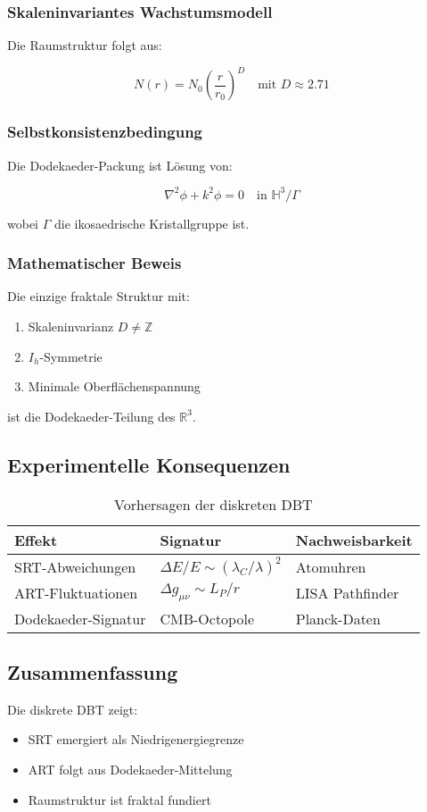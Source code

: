 \subsubsection{Skaleninvariantes Wachstumsmodell}
Die Raumstruktur folgt aus:

\begin{equation}
N(r) = N_0\left(\frac{r}{r_0}\right)^D \quad \text{mit } D \approx 2.71
\end{equation}

\subsubsection{Selbstkonsistenzbedingung}
Die Dodekaeder-Packung ist Lösung von:

\begin{equation}
\nabla^2\phi + k^2\phi = 0 \quad \text{in } \mathbb{H}^3/\Gamma
\end{equation}

wobei $\Gamma$ die ikosaedrische Kristallgruppe ist.

\subsubsection{Mathematischer Beweis}
\begin{theorem}
Die einzige fraktale Struktur mit:
\begin{enumerate}
\item Skaleninvarianz $D \neq \mathbb{Z}$
\item $I_h$-Symmetrie
\item Minimale Oberflächenspannung
\end{enumerate}
ist die Dodekaeder-Teilung des $\mathbb{R}^3$.
\end{theorem}

\subsection{Experimentelle Konsequenzen}
\label{subsec:experiments}

\begin{table}[h]
\centering
\caption{Vorhersagen der diskreten DBT}
\begin{tabular}{lll}
\hline
Effekt & Signatur & Nachweisbarkeit \\
\hline
SRT-Abweichungen & $\Delta E/E \sim (\lambda_C/\lambda)^2$ & Atomuhren \\
ART-Fluktuationen & $\Delta g_{\mu\nu} \sim L_P/r$ & LISA Pathfinder \\
Dodekaeder-Signatur & CMB-Octopole & Planck-Daten \\
\hline
\end{tabular}
\end{table}

\subsection{Zusammenfassung}
Die diskrete DBT zeigt:
\begin{itemize}
\item SRT emergiert als Niedrigenergiegrenze
\item ART folgt aus Dodekaeder-Mittelung
\item Raumstruktur ist fraktal fundiert
\end{itemize}
